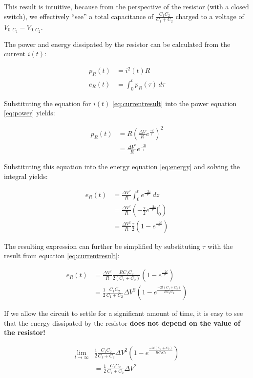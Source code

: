 This result is intuitive, because from the perspective of the resistor (with a
closed   switch),   we   effectively   ``see''   a   total    capacitance   of
$\frac{C_1C_2}{C_1+C_2}$  charged  to  a voltage of $V_{0,C_1}  -  V_{0,C_2}$.

The power and  energy  dissipated  by  the resistor can be calculated from the
current $i(t)$:

\begin{align}
    p_R(t) &= i^2(t) R \label{eq:power} \\
    e_R(t) &= \int_0^t p_R(\tau)\,d\tau \label{eq:energy}
\end{align}

Substituting  the equation for $i(t)$ \ref{eq:currentresult}  into  the  power
equation \ref{eq:power} yields:

\begin{align}
    p_R(t) &= R\left(\frac{\Delta V}{R} e^{\frac{-t}{\tau}}\right)^2 \\
           &= \frac{{\Delta V}^2}{R} e^{\frac{-2t}{\tau}}
\end{align}

Substituting  this  equation  into the  energy  equation  \ref{eq:energy}  and
solving the integral yields:

\begin{align}
    e_R(t) &= \frac{{\Delta V}^2}{R} \int_0^t e^{\frac{-2z}{\tau}}\,dz \\
           &= \frac{{\Delta V}^2}{R} \left(-\frac{\tau}{2} e^{\frac{-2z}{\tau}} \bigg|_0^t\right) \\
           &= \frac{{\Delta V}^2}{R} \frac{\tau}{2}\left(1 - e^{\frac{-2t}{\tau}}\right)
\end{align}

The resulting expression can further be simplified by substituting $\tau$ with
the result from equation \ref{eq:currentresult}:

\begin{align}
    e_R(t) &= \frac{{\Delta V}^2}{R} \frac{RC_1C_2}{2\left(C_1+C_2\right)}\left(1 - e^{\frac{-2t}{\tau}}\right) \\
           &= \frac{1}{2} \frac{C_1C_2}{C_1+C_2} {\Delta V}^2 \left(1 - e^{\frac{-2t\left(C_1+C_2\right)}{RC_1C_2}}\right)
\end{align}

If we allow the circuit to settle for a significant amount of time, it is easy
to see that  the  energy dissipated by the resistor \textbf{does not depend on
the value of the resistor!}

\begin{align}
    \lim_{t\to\infty} & \frac{1}{2} \frac{C_1C_2}{C_1+C_2} {\Delta V}^2 \left(1 - e^{\frac{-2t\left(C_1+C_2\right)}{RC_1C_2}}\right) \\
    &= \frac{1}{2} \frac{C_1C_2}{C_1+C_2} {\Delta V}^2 \label{eq:resistor energy}
\end{align}
